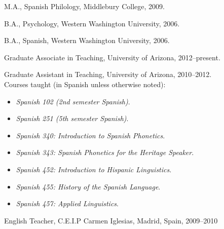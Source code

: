 \documentclass[11pt]{article}
\begin{document}
\noindent M.A., Spanish Philology, Middlebury College, 2009. \\ \vspace{-0.1in}

\noindent B.A., \hspace{.4mm} Psychology, Western Washington University, 2006. \\ \vspace{-0.1in}

\noindent B.A., \hspace{.4mm} Spanish, Western Washington University, 2006. 


\bigskip
 

\medskip
\noindent Graduate Associate in Teaching, University of Arizona, 2012--present. \\ \vspace{-0.1in}

\noindent Graduate Assistant in Teaching, University of Arizona, 2010--2012. \\
\noindent Courses taught (in Spanish unless otherwise noted):\vspace{-0.075in}
\begin{itemize}
  \item \small \emph{Spanish 102 (2nd semester Spanish)}.\vspace{-0.1in}
  \item \small \emph{Spanish 251 (5th semester Spanish)}.\vspace{-0.1in}
  \item \small \emph{Spanish 340: Introduction to Spanish Phonetics}.\vspace{-0.1in}
  \item \small \emph{Spanish 343: Spanish Phonetics for the Heritage Speaker}.\vspace{-0.1in}
  \item \small \emph{Spanish 452: Introduction to Hispanic Linguistics}.\vspace{-0.1in}
  \item \small \emph{Spanish 455: History of the Spanish Language}.\vspace{-0.1in}
  \item \small \emph{Spanish 457: Applied Linguistics}.
\end{itemize} 
\noindent English Teacher, C.E.I.P Carmen Iglesias, Madrid, Spain, 2009--2010 \\ \vspace{-0.1in}
\end{document}
